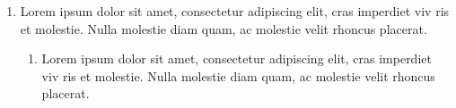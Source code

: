 
\begin{enumerate}[label=(\alph*)]
\item Lorem ipsum dolor sit amet, consectetur adipiscing elit, cras imperdiet viv ris et molestie. Nulla molestie diam quam, ac molestie velit rhoncus placerat.
\begin{enumerate}[label=(\roman*)]
\item Lorem ipsum dolor sit amet, consectetur adipiscing elit, cras imperdiet viv ris et molestie. Nulla molestie diam quam, ac molestie velit rhoncus placerat.
\end{enumerate}
\end{enumerate}


